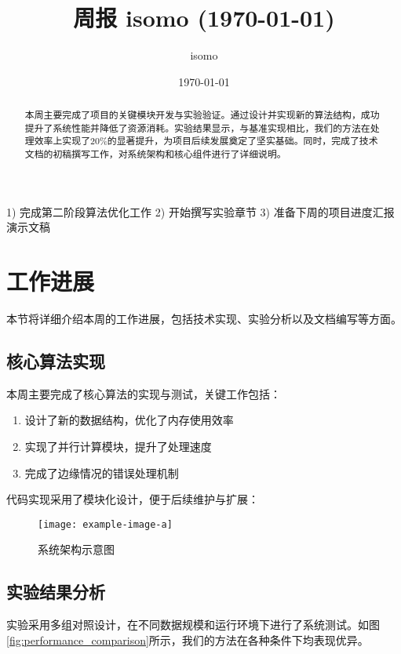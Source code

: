 \documentclass{article}
\title{周报 isomo (\today)}
\author{isomo}
\date{\today}
\begin{document}
\maketitle

\begin{abstract}
  本周主要完成了项目的关键模块开发与实验验证。通过设计并实现新的算法结构，成功提升了系统性能并降低了资源消耗。实验结果显示，与基准实现相比，我们的方法在处理效率上实现了20\%的显著提升，为项目后续发展奠定了坚实基础。同时，完成了技术文档的初稿撰写工作，对系统架构和核心组件进行了详细说明。
\end{abstract}

\begin{weekplan}
1) 完成第二阶段算法优化工作 2) 开始撰写实验章节 3) 准备下周的项目进度汇报演示文稿
\end{weekplan}

\section{工作进展}

本节将详细介绍本周的工作进展，包括技术实现、实验分析以及文档编写等方面。

\subsection{核心算法实现}

本周主要完成了核心算法的实现与测试，关键工作包括：

\begin{enumerate}
\item 设计了新的数据结构，优化了内存使用效率
\item 实现了并行计算模块，提升了处理速度
\item 完成了边缘情况的错误处理机制
\end{enumerate}

代码实现采用了模块化设计，便于后续维护与扩展：

\begin{figure}[h]
\centering
\texttt{[image: example-image-a]}
\caption{系统架构示意图}
\label{fig:system_architecture}
\end{figure}

\subsection{实验结果分析}

实验采用多组对照设计，在不同数据规模和运行环境下进行了系统测试。如图\ref{fig:performance_comparison}所示，我们的方法在各种条件下均表现优异。
\end{document}
